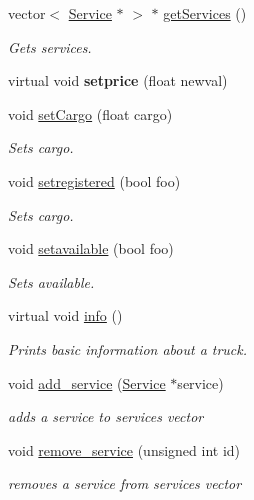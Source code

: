 \begin{DoxyCompactItemize}
vector$<$ \hyperlink{class_service}{Service} $\ast$ $>$ $\ast$ \hyperlink{class_truck_a207506f38e78d7a5f065893295a2c00d}{get\+Services} ()
\begin{DoxyCompactList}\small\item\em Gets services. \end{DoxyCompactList}\item 
\mbox{\label{class_truck_a22d2dc22b1c5b9652d463ec624442403}} 
virtual void {\bfseries setprice} (float newval)
\item 
void \hyperlink{class_truck_ac26288a4d560deb5383fd07618fb13e6}{set\+Cargo} (float cargo)
\begin{DoxyCompactList}\small\item\em Sets cargo. \end{DoxyCompactList}\item 
void \hyperlink{class_truck_a9268e17e1a967d1702b28c6940403aa4}{setregistered} (bool foo)
\begin{DoxyCompactList}\small\item\em Sets cargo. \end{DoxyCompactList}\item 
void \hyperlink{class_truck_a59ca935a364da118131ed85647aa4f0d}{setavailable} (bool foo)
\begin{DoxyCompactList}\small\item\em Sets available. \end{DoxyCompactList}\item 
virtual void \hyperlink{class_truck_a38f09eab2822524e355ecf6d0a13f7de}{info} ()
\begin{DoxyCompactList}\small\item\em Prints basic information about a truck. \end{DoxyCompactList}\item 
void \hyperlink{class_truck_a03c8acd51c35f24db74cd8b2ee20cacb}{add\+\_\+service} (\hyperlink{class_service}{Service} $\ast$service)
\begin{DoxyCompactList}\small\item\em adds a service to services vector \end{DoxyCompactList}\item 
void \hyperlink{class_truck_a0abc7397fd6dba0eeeb2b5ae3e225fd1}{remove\+\_\+service} (unsigned int id)
\begin{DoxyCompactList}\small\item\em removes a service from services vector \end{DoxyCompactList}\item 

\end{DoxyCompactItemize}
